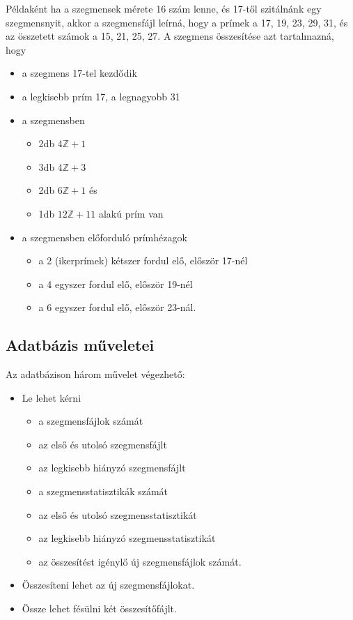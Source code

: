 Példaként ha a szegmensek mérete 16 szám lenne, és 17-től szitálnánk egy szegmensnyit, akkor a szegmensfájl leírná, hogy a prímek a 17, 19, 23, 29, 31, és az összetett számok a 15, 21, 25, 27.
A szegmens összesítése azt tartalmazná, hogy
\begin{itemize}
\item a szegmens 17-tel kezdődik
\item a legkisebb prím 17, a legnagyobb 31
\item a szegmensben
\begin{itemize}
\item 2db $4\mathbb{Z}+1$
\item 3db $4\mathbb{Z}+3$
\item 2db $6\mathbb{Z}+1$ és		
\item 1db $12\mathbb{Z}+11$ alakú prím van
\end{itemize}
\item a szegmensben előforduló prímhézagok
\begin{itemize}
\item a 2 (ikerprímek) kétszer fordul elő, először 17-nél
\item a 4 egyszer fordul elő, először 19-nél
\item a 6 egyszer fordul elő, először 23-nál.
\end{itemize}
\end{itemize}

\subsection{Adatbázis műveletei}

Az adatbázison három művelet végezhető:
\begin{itemize}

\item Le lehet kérni
\begin{itemize}
\item a szegmensfájlok számát
\item az első és utolsó szegmensfájlt
\item az legkisebb hiányzó szegmensfájlt
\item a szegmensstatisztikák számát
\item az első és utolsó szegmensstatisztikát
\item az legkisebb hiányzó szegmensstatisztikát
\item az összesítést igénylő új szegmensfájlok számát.
\end{itemize}

\item Összesíteni lehet az új szegmensfájlokat.

\item Össze lehet fésülni két összesítőfájlt.

\end{itemize}

